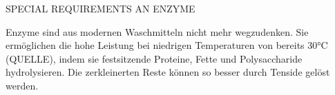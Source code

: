 \documentclass[main.tex]{subfiles}
\begin{document}
SPECIAL REQUIREMENTS AN ENZYME

Enzyme sind aus modernen Waschmitteln nicht mehr wegzudenken. Sie ermöglichen die hohe Leistung bei niedrigen Temperaturen von bereits 30°C (QUELLE), indem sie festsitzende Proteine, Fette und Polysaccharide hydrolysieren. Die zerkleinerten Reste können so besser durch Tenside gelöst werden.
\end{document}
